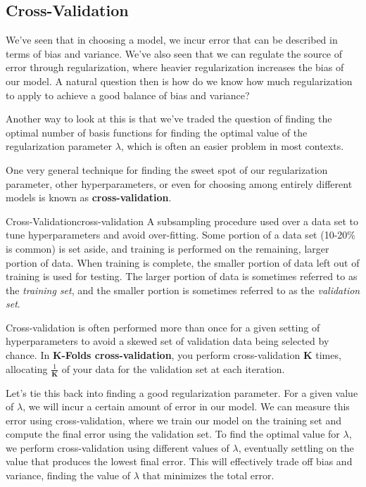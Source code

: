 \subsection{Cross-Validation}
We've seen that in choosing a model, we incur error that can be described in terms of bias and variance. We've also seen that we can regulate the source of error through regularization, where heavier regularization increases the bias of our model. A natural question then is how do we know how much regularization to apply to achieve a good balance of bias and variance?

Another way to look at this is that we've traded the question of finding the optimal number of basis functions for finding the optimal value of the regularization parameter $\lambda$, which is often an easier problem in most contexts.

One very general technique for finding the sweet spot of our regularization parameter, other hyperparameters, or even for choosing among entirely different models is known as \textbf{cross-validation}.

\begin{definition}{Cross-Validation}{cross-validation}
    A subsampling procedure used over a data set to tune hyperparameters and avoid over-fitting. Some portion of a data set (10-20\% is common) is set aside, and training is performed on the remaining, larger portion of data. When training is complete, the smaller portion of data left out of training is used for testing. The larger portion of data is sometimes referred to as the \textit{training set}, and the smaller portion is sometimes referred to as the \textit{validation set}.
\end{definition}

Cross-validation is often performed more than once for a given setting of hyperparameters to avoid a skewed set of validation data being selected by chance. In \textbf{K-Folds cross-validation}, you perform cross-validation \textbf{K} times, allocating $\frac{1}{\textbf{K}}$ of your data for the validation set at each iteration.

Let's tie this back into finding a good regularization parameter. For a given value of $\lambda$, we will incur a certain amount of error in our model. We can measure this error using cross-validation, where we train our model on the training set and compute the final error using the validation set. To find the optimal value for $\lambda$, we perform cross-validation using different values of $\lambda$, eventually settling on the value that produces the lowest final error. This will effectively trade off bias and variance, finding the value of $\lambda$ that minimizes the total error.

